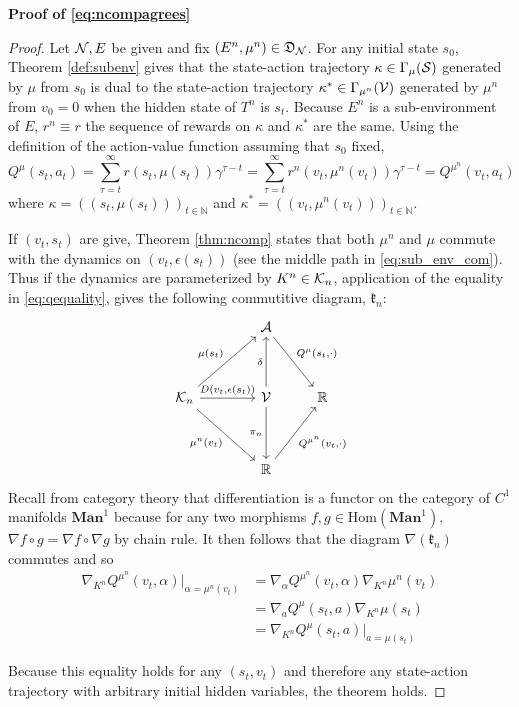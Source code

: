 \textbf{Proof of \eqref{eq:ncompagrees}}
\begin{proof}
  Let ${\mathcal N}, E$ be given and fix $(E^n, \mu^n) \in \mathfrak{D}_{\mathcal N}$.
  For any initial state $s_0$, Theorem  \ref{def:subenv} gives that the state-action trajectory $\kappa \in \Gamma_\mu({\mathcal S})$ generated by $\mu$ from $s_0$ is dual to the state-action trajectory $\kappa^* \in \Gamma_{\mu^n}({\mathcal V})$ generated by $\mu^n$ from $v_0 = 0$ when the hidden state of $T^n$ is $s_t$. Because $E^n$ is a sub-environment of $E$, $r^n \equiv r$ the sequence of rewards on $\kappa$ and $\kappa^*$ are the same. Using the definition of the action-value function assuming that $s_0$ fixed, 
  \begin{equation}\label{eq:qequality}
      Q^{\mu}(s_t, a_t) = \sum_{\tau =t}^\infty r(s_t, \mu(s_t)) \gamma^{\tau - t} = \sum_{\tau =t}^\infty r^n(v_t, \mu^n(v_t)) \gamma^{\tau - t} = Q^{\mu^n}(v_t, a_t)
  \end{equation}
  where $\kappa = ((s_t, \mu(s_t)))_{t\in\mathbb{N}}$ and $\kappa^* = ((v_t,\mu^n(v_t)))_{t\in\mathbb{N}}.$ 


  
If $(v_t, s_t)$ are give, Theorem \ref{thm:ncomp} states that both $\mu^n$ and $\mu$ commute with the dynamics on $(v_t, \epsilon(s_t))$ (see the middle path in \eqref{eq:sub_env_com}). Thus if the dynamics are parameterized by $K^n \in {\mathcal K}_n$, application of the equality in \eqref{eq:qequality}, gives the following commutitive diagram, $\mathfrak{k}_n$:
  \begin{equation}\label{eq:kparam}
    \begin{tikzcd}
    &[+15pt] \scripta \arrow{rd}{Q^{\mu}(s_t, \cdot)}\\[+18pt]
      \scriptk_n \arrow{r}{D(v_t, \epsilon(s_t))}
            \arrow{rd}[swap]{\mu^n(v_t)} 
            \arrow{ru}{\mu(s_t)} & \scriptv \arrow{d}[swap]{\pi_n}\arrow{u}{\delta} & \mathbb{R}\\[+18pt]
      & \mathbb{R} \arrow{ru}[swap]{Q^{\mu^n}(v_t, \cdot)}
    \end{tikzcd}
  \end{equation}
  Recall from category theory that differentiation is a functor on the category of $C^1$ manifolds $\mathrm{\textbf{Man}}^1$ because for any two
  morphisms $f,g \in \mathrm{Hom}(\mathrm{\textbf{Man}}^1),$ $\nabla f \circ g = \nabla f \circ \nabla g$ by chain rule. It then follows that the diagram $\nabla(\mathfrak{k}_n)$ commutes and so
  \begin{equation*}
  \begin{aligned}
    \nabla_{K^n} Q^{\mu^n}(v_t, \alpha) \Big|_{\alpha=\mu^n(v_t)}
    &= \nabla_\alpha Q^{\mu^n}(v_t, \alpha) \nabla_{K^n} \mu^n(v_t) \\
    &=\nabla_a Q^{\mu}(s_t, a) \nabla_{K^n} \mu(s_t) \\
    &=\nabla_{K^n} Q^\mu(s_t, a) \Big|_{a = \mu(s_t)}
  \end{aligned}
  \end{equation*}
  
  Because this equality holds for any $(s_t, v_t)$ and therefore any state-action trajectory with arbitrary initial hidden variables, the theorem holds.
\end{proof}
